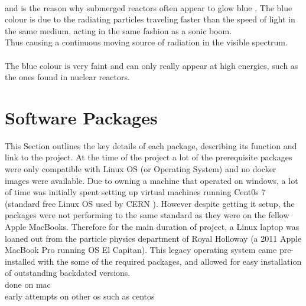 \documentclass[12pt,a4paper]{article}
\begin{document}
\\
and is the reason why submerged reactors often appear to glow blue \cite{blue}. The blue colour is due to the radiating particles traveling faster than the speed of light in the same medium, acting in the same fashion as a sonic boom. 
\\Thus causing a continuous moving source of radiation in the visible spectrum.\\
\\
 The blue colour is very faint and can only really appear at high energies, such as the ones found in nuclear reactors. 


\section{Software Packages}
\label{packs}
This Section outlines the key details of each package, describing its function and link to the project. At the time of the project a lot of the prerequisite packages were only compatible with Linux OS  (or Operating System) and no docker images were available. Due to owning a machine that operated on windows, a lot of time was initially spent setting up virtual machines running Cent0s 7 (standard free Linux OS used by CERN \cite{cern}). However despite getting it setup, the packages were not performing to the same standard as they were on the fellow Apple MacBooks. Therefore for the main duration of project, a Linux laptop was loaned out from the particle physics department of Royal Holloway (a 2011 Apple MacBook Pro running OS El Capitan). This legacy operating system came pre-installed with the some of the required packages, and allowed for easy installation of outstanding backdated versions. 
\\
done on mac\\
early attempts on other os such as centos\\





\end{document}
